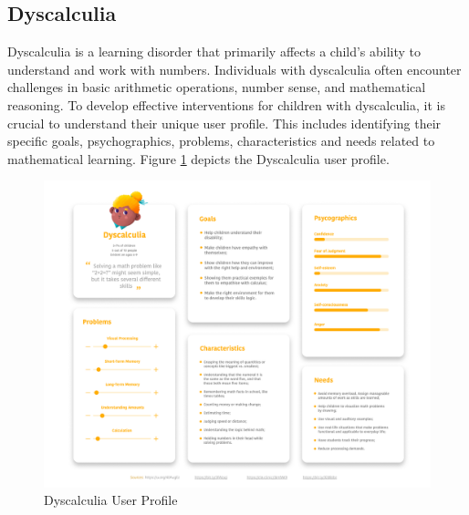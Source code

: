 \subsection{Dyscalculia}

Dyscalculia is a learning disorder that primarily affects a child's ability to understand and work with numbers. Individuals with dyscalculia often encounter challenges in basic arithmetic operations, number sense, and mathematical reasoning. To develop effective interventions for children with dyscalculia, it is crucial to understand their unique user profile. This includes identifying their specific goals, psychographics, problems, characteristics and needs related to mathematical learning. Figure \ref{fig:dyscalculiaUserProfile} depicts the Dyscalculia user profile.

\begin{figure}[H]
    \centering
    \includegraphics[width=1\linewidth]{Chapters/figma/Discalculia.png}
    \caption{Dyscalculia User Profile}
    \label{fig:dyscalculiaUserProfile}
\end{figure}

